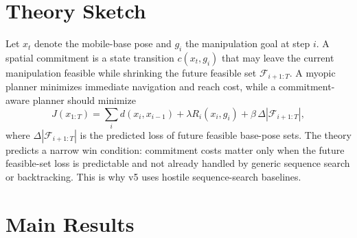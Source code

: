 \documentclass{article}
\begin{document}
\section{Theory Sketch}
Let $x_t$ denote the mobile-base pose and $g_i$ the manipulation goal at step $i$. A spatial commitment is a state transition $c(x_t, g_i)$ that may leave the current manipulation feasible while shrinking the future feasible set $\mathcal{F}_{i+1:T}$. A myopic planner minimizes immediate navigation and reach cost, while a commitment-aware planner should minimize
\[
J(x_{1:T})=\sum_i d(x_i,x_{i-1})+\lambda R_i(x_i,g_i)+\beta\,\Delta |\mathcal{F}_{i+1:T}|,
\]
where $\Delta |\mathcal{F}_{i+1:T}|$ is the predicted loss of future feasible base-pose sets. The theory predicts a narrow win condition: commitment costs matter only when the future feasible-set loss is predictable and not already handled by generic sequence search or backtracking. This is why v5 uses hostile sequence-search baselines.

\section{Main Results}
\begin{table}[tbp]
\centering
\scriptsize
\setlength{\tabcolsep}{3.0pt}
\caption{Decisive combined long-horizon split}
\end{table}
\end{document}
